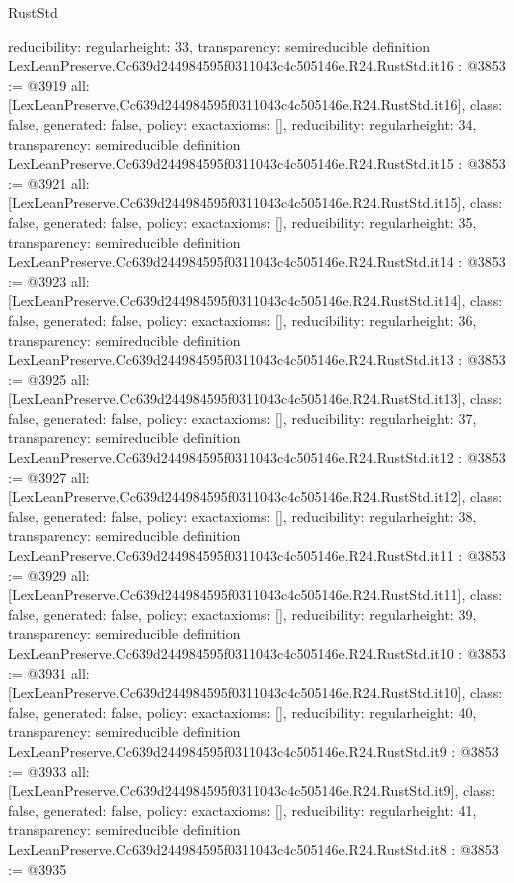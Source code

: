 \begin{lexlean}{RustStd}
\begin{coremodule}
{  reducibility: regular{height: 33},
  transparency: semireducible
}
definition LexLeanPreserve.Cc639d244984595f0311043c4c505146e.R24.RustStd.it16 : @3853 := @3919 {
  all: [LexLeanPreserve.Cc639d244984595f0311043c4c505146e.R24.RustStd.it16],
  class: false,
  generated: false,
  policy: exact{axioms: []},
  reducibility: regular{height: 34},
  transparency: semireducible
}
definition LexLeanPreserve.Cc639d244984595f0311043c4c505146e.R24.RustStd.it15 : @3853 := @3921 {
  all: [LexLeanPreserve.Cc639d244984595f0311043c4c505146e.R24.RustStd.it15],
  class: false,
  generated: false,
  policy: exact{axioms: []},
  reducibility: regular{height: 35},
  transparency: semireducible
}
definition LexLeanPreserve.Cc639d244984595f0311043c4c505146e.R24.RustStd.it14 : @3853 := @3923 {
  all: [LexLeanPreserve.Cc639d244984595f0311043c4c505146e.R24.RustStd.it14],
  class: false,
  generated: false,
  policy: exact{axioms: []},
  reducibility: regular{height: 36},
  transparency: semireducible
}
definition LexLeanPreserve.Cc639d244984595f0311043c4c505146e.R24.RustStd.it13 : @3853 := @3925 {
  all: [LexLeanPreserve.Cc639d244984595f0311043c4c505146e.R24.RustStd.it13],
  class: false,
  generated: false,
  policy: exact{axioms: []},
  reducibility: regular{height: 37},
  transparency: semireducible
}
definition LexLeanPreserve.Cc639d244984595f0311043c4c505146e.R24.RustStd.it12 : @3853 := @3927 {
  all: [LexLeanPreserve.Cc639d244984595f0311043c4c505146e.R24.RustStd.it12],
  class: false,
  generated: false,
  policy: exact{axioms: []},
  reducibility: regular{height: 38},
  transparency: semireducible
}
definition LexLeanPreserve.Cc639d244984595f0311043c4c505146e.R24.RustStd.it11 : @3853 := @3929 {
  all: [LexLeanPreserve.Cc639d244984595f0311043c4c505146e.R24.RustStd.it11],
  class: false,
  generated: false,
  policy: exact{axioms: []},
  reducibility: regular{height: 39},
  transparency: semireducible
}
definition LexLeanPreserve.Cc639d244984595f0311043c4c505146e.R24.RustStd.it10 : @3853 := @3931 {
  all: [LexLeanPreserve.Cc639d244984595f0311043c4c505146e.R24.RustStd.it10],
  class: false,
  generated: false,
  policy: exact{axioms: []},
  reducibility: regular{height: 40},
  transparency: semireducible
}
definition LexLeanPreserve.Cc639d244984595f0311043c4c505146e.R24.RustStd.it9 : @3853 := @3933 {
  all: [LexLeanPreserve.Cc639d244984595f0311043c4c505146e.R24.RustStd.it9],
  class: false,
  generated: false,
  policy: exact{axioms: []},
  reducibility: regular{height: 41},
  transparency: semireducible
}
definition LexLeanPreserve.Cc639d244984595f0311043c4c505146e.R24.RustStd.it8 : @3853 := @3935 {
}
\end{coremodule}
\end{lexlean}

